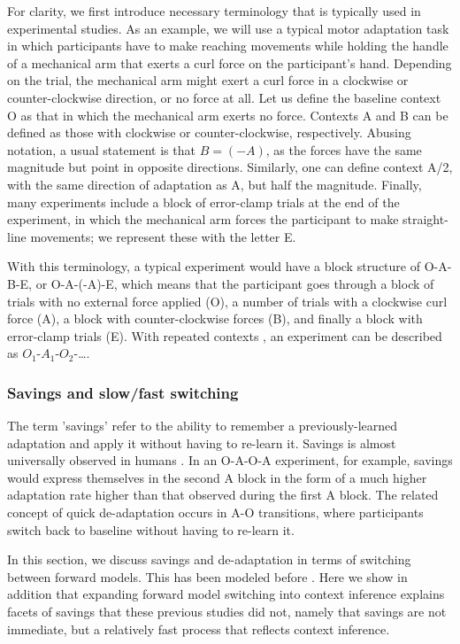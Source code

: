 \documentclass[a4paper,doc,floatsintext,natbib]{apa6}%
\begin{document}
For clarity, we first introduce necessary terminology that is typically used in experimental studies. As an example, we will use a typical motor adaptation task in which participants have to make reaching movements while holding the handle of a mechanical arm that exerts a curl force on the participant's hand. Depending on the trial, the mechanical arm might exert a curl force in a clockwise or counter-clockwise direction, or no force at all. Let us define the baseline context O as that in which the mechanical arm exerts no force. Contexts A and B can be defined as those with clockwise or counter-clockwise, respectively. Abusing notation, a usual statement is that $B = (-A)$, as the forces have the same magnitude but point in opposite directions. Similarly, one can define context A/2, with the same direction of adaptation as A, but half the magnitude. Finally, many experiments include a block of error-clamp trials at the end of the experiment, in which the mechanical arm forces the participant to make straight-line movements; we represent these with the letter E.

With this terminology, a typical experiment \cite[e.g.][]{Ethier_Spontaneous_2008} would have a block structure of O-A-B-E, or O-A-(-A)-E, which means that the participant goes through a block of trials with no external force applied (O), a number of trials with a clockwise curl force (A), a block with counter-clockwise forces (B), and finally a block with error-clamp trials (E). With repeated contexts \citep[e.g.][]{Oh_Minimizing_2019}, an experiment can be described as $O_1$-$A_1$-$O_2$-\ldots .

\subsubsection{Savings and slow/fast switching}
The term 'savings' refer to the ability to remember a previously-learned adaptation and apply it without having to re-learn it. Savings is almost universally observed in humans \citep{Brashers-Krug_Consolidation_1996,Shadmehr_Functional_1997,Medina_Mechanism_2001,Smith_Interacting_2006,Zarahn_Explaining_2008}. In an O-A-O-A experiment, for example, savings would express themselves in the second A block in the form of a much higher adaptation rate higher than that observed during the first A block. The related concept of quick de-adaptation occurs in A-O transitions, where participants switch back to baseline without having to re-learn it.

In this section, we discuss savings and de-adaptation in terms of switching between forward models. This has been modeled before \citep[e.g.][]{Wolpert_Multiple_1998,Oh_Minimizing_2019,Imamizu_Explicit_2007}. Here we show in addition that expanding forward model switching into context inference explains facets of savings that these previous studies did not, namely that savings are not immediate, but a relatively fast process that reflects context inference.
\end{document}
